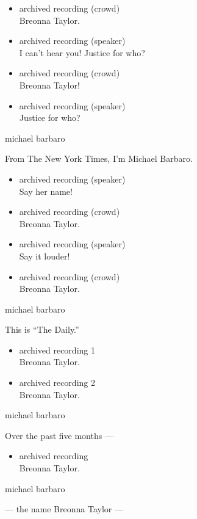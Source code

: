 \begin{itemize}
\item
  archived recording (crowd)\\
  Breonna Taylor.
\item
  archived recording (speaker)\\
  I can't hear you! Justice for who?
\item
  archived recording (crowd)\\
  Breonna Taylor!
\item
  archived recording (speaker)\\
  Justice for who?
\end{itemize}

michael barbaro

From The New York Times, I'm Michael Barbaro.

\begin{itemize}
\item
  archived recording (speaker)\\
  Say her name!
\item
  archived recording (crowd)\\
  Breonna Taylor.
\item
  archived recording (speaker)\\
  Say it louder!
\item
  archived recording (crowd)\\
  Breonna Taylor.
\end{itemize}

michael barbaro

This is ``The Daily.''

\begin{itemize}
\item
  archived recording 1\\
  Breonna Taylor.
\item
  archived recording 2\\
  Breonna Taylor.
\end{itemize}

michael barbaro

Over the past five months ---

\begin{itemize}
\tightlist
\item
  archived recording\\
  Breonna Taylor.
\end{itemize}

michael barbaro

--- the name Breonna Taylor ---

